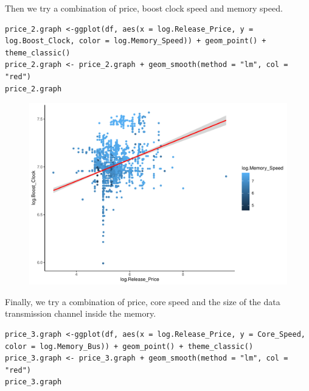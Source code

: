 \documentclass[a4paper]{article}
\begin{document}
Then we try a combination of price, boost clock speed and memory speed.
\begin{mdframed}[leftline=false,rightline=false,backgroundcolor=lightblue!10,nobreak=false]
    \begin{verbatim}
price_2.graph <-ggplot(df, aes(x = log.Release_Price, y = log.Boost_Clock, color = log.Memory_Speed)) + geom_point() + theme_classic()
price_2.graph <- price_2.graph + geom_smooth(method = "lm", col = "red")
price_2.graph
    \end{verbatim}
\end{mdframed}
\begin{figure}[H]
    \centering
    \includegraphics[keepaspectratio, width=1\textwidth, height=1\textheight]{LRM/Rplot8.pdf}
\end{figure}
Finally, we try a combination of price, core speed and the size of the data transmission channel inside the memory.
\begin{mdframed}[leftline=false,rightline=false,backgroundcolor=lightblue!10,nobreak=false]
    \begin{verbatim}
price_3.graph <-ggplot(df, aes(x = log.Release_Price, y = Core_Speed, color = log.Memory_Bus)) + geom_point() + theme_classic()
price_3.graph <- price_3.graph + geom_smooth(method = "lm", col = "red")
price_3.graph
    \end{verbatim}
\end{mdframed}
\end{document}
